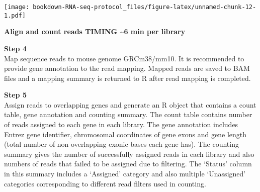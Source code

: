 \documentclass[]{book}
\newenvironment{Shaded}{\begin{snugshade}}{\end{snugshade}}
\newcommand{\DataTypeTok}[1]{\textcolor[rgb]{0.13,0.29,0.53}{#1}}
\newcommand{\DecValTok}[1]{\textcolor[rgb]{0.00,0.00,0.81}{#1}}
\newcommand{\KeywordTok}[1]{\textcolor[rgb]{0.13,0.29,0.53}{\textbf{#1}}}
\newcommand{\NormalTok}[1]{#1}
\newcommand{\OperatorTok}[1]{\textcolor[rgb]{0.81,0.36,0.00}{\textbf{#1}}}
\newcommand{\OtherTok}[1]{\textcolor[rgb]{0.56,0.35,0.01}{#1}}
\newcommand{\StringTok}[1]{\textcolor[rgb]{0.31,0.60,0.02}{#1}}
\begin{document}
\texttt{[image: bookdown-RNA-seq-protocol\_files/figure-latex/unnamed-chunk-12-1.pdf]}

\textbf{Align and count reads TIMING \textasciitilde{}6 min per library}

\textbf{Step 4}\\
Map sequence reads to mouse genome GRCm38/mm10. It is recommended to provide gene annotation to the read mapping. Mapped reads are saved to BAM files and a mapping summary is returned to R after read mapping is completed.

\begin{Shaded}
\end{Shaded}

\textbf{Step 5}\\
Assign reads to overlapping genes and generate an R object that contains a count table, gene annotation and counting summary. The count table contains number of reads assigned to each gene in each library. The gene annotation includes Entrez gene identifier, chromosomal coordinates of gene exons and gene length (total number of non-overlapping exonic bases each gene has). The counting summary gives the number of successfully assigned reads in each library and also numbers of reads that failed to be assigned due to filtering. The `Status' column in this summary includes a `Assigned' category and also multiple `Unassigned' categories corresponding to different read filters used in counting.

\begin{Shaded}
\end{Shaded}
\end{document}
